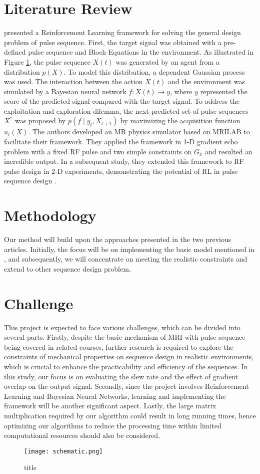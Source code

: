 \section{Literature Review}
\citet{0438} presented a Reinforcement Learning framework for solving the general design problem of pulse sequence. First, the target signal was obtained with a pre-defined pulse sequence and Bloch Equations in the environment. As illustrated in Figure \ref{schematic}, the pulse sequence $X(t)$ was generated by an agent from a distribution $p(X)$. To model this distribution, a dependent Gaussian process was used. The interaction between the action $X(t)$ and the environment was simulated by a Bayesian neural network $f:X(t) \rightarrow y$, where $y$ represented the score of the predicted signal compared with the target signal. To address the exploitation and exploration dilemma, the next predicted set of pulse sequences $X^*$ was proposed by $p\left(f \mid y_t, X_{t+1}\right)$ by maximizing the acquisition function $u_t(X)$. The authors developed an MR physics simulator based on MRILAB to facilitate their framework. They applied the framework in 1-D gradient echo problem with a fixed RF pulse and two simple constraints on $G_x$ and resulted an incredible output. In a subsequent study, they extended this framework to RF pulse design in 2-D experiments, demonstrating the potential of RL in pulse sequence design \cite{0477}.

\section{Methodology}
Our method will build upon the approaches presented in the two previous articles. Initially, the focus will be on implementing the basic model mentioned in \citep{0438}, and subsequently, we will concentrate on meeting the realistic constraints and extend to other sequence design problem. 

\section{Challenge}
This project is expected to face various challenges, which can be divided into several parts. Firstly, despite the basic mechanism of MRI with pulse sequence being covered in related courses, further research is required to explore the constraints of mechanical properties on sequence design in realistic environments, which is crucial to enhance the practicability and efficiency of the sequences. In this study, our focus is on evaluating the slew rate and the effect of gradient overlap on the output signal. Secondly, since the project involves Reinforcement Learning and Bayesian Neural Networks, learning and implementing the framework will be another significant aspect. Lastly, the large matrix multiplication required by our algorithm could result in long running times, hence optimizing our algorithms to reduce the processing time within limited computational resources should also be considered.


\begin{figure}[ht]
    \centering
    \texttt{[image: schematic.png]}
    \caption{title}
    \label{schematic}
\end{figure}